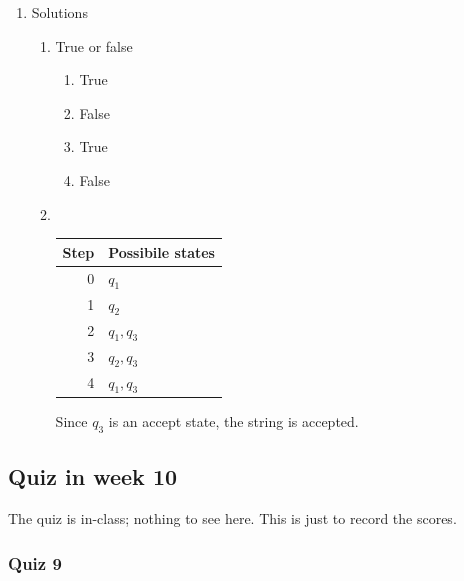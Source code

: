 \documentclass{amsart}
\begin{document}
\begin{enumerate}
\item Solutions
\label{sec:org055cfba}
\begin{enumerate}
\item True or false
\begin{enumerate}
\item True
\item False
\item True
\item False
\end{enumerate}

\item \mbox{}\\

\begin{center}
\begin{tabular}{rl}
Step & Possibile states\\
\hline
0 & \(q_1\)\\
1 & \(q_2\)\\
2 & \(q_1,q_3\)\\
3 & \(q_2,q_3\)\\
4 & \(q_1, q_3\)\\
\end{tabular}
\end{center}

Since \(q_3\) is an accept state, the string is accepted.
\end{enumerate}
\end{enumerate}
\subsection{Quiz in week 10}
\label{sec:org08e902e}
The quiz is in-class; nothing to see here.  This is just to record the scores.
\subsubsection{Quiz 9}
\label{sec:orge594bc8}
\thispagestyle{empty}
\end{document}
